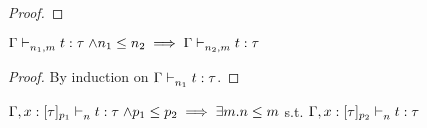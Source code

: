 \documentclass{article}
\begin{document}
\begin{proof}
\end{proof}

\begin{lemma} 
	\label{lem:deweaken1}
	$\Gamma \mathrel{\vdash_{n_1,m}^{} {t} : {\tau}} \land n_1 \leq n_2 \implies \Gamma \mathrel{\vdash_{n_2,m}^{} {t} : {\tau}}$\\
\end{lemma}
\begin{proof}
  By induction on $\Gamma \mathrel{\vdash_{n_1}^{} {t} : {\tau}}  $.
\end{proof}

\begin{lemma} 
	\label{lem:deweaken2}
	$\Gamma, x:[\tau]_{p_1} \mathrel{\vdash_{n}^{} {t} : {\tau}} \land p_1 \leq p_2 \implies \exists m. n \leq m$ s.t. $\Gamma, x:[\tau]_{p_2} \mathrel{\vdash_{n}^{} {t} : {\tau}} $\\
\end{lemma}
\end{document}
